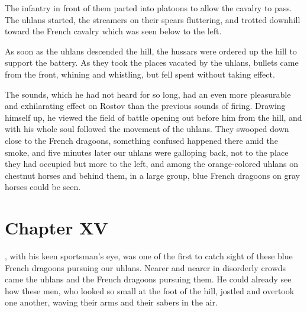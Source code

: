 The infantry in front of them parted into platoons to allow the
cavalry to pass. The uhlans started, the streamers on their
spears fluttering, and trotted downhill toward the French cavalry
which was seen below to the left.

As soon as the uhlans descended the hill, the hussars were
ordered up the hill to support the battery. As they took the
places vacated by the uhlans, bullets came from the front,
whining and whistling, but fell spent without taking effect.

The sounds, which he had not heard for so long, had an even more
pleasurable and exhilarating effect on Rostov than the previous
sounds of firing. Drawing himself up, he viewed the field of
battle opening out before him from the hill, and with his whole
soul followed the movement of the uhlans. They swooped down close
to the French dragoons, something confused happened there amid
the smoke, and five minutes later our uhlans were galloping back,
not to the place they had occupied but more to the left, and
among the orange-colored uhlans on chestnut horses and behind
them, in a large group, blue French dragoons on gray horses could
be seen.


\chapter*{Chapter XV}
\ifaudio     
{} 
\fi

, with his keen sportsman's eye, was one of the first to
catch sight of these blue French dragoons pursuing our
uhlans. Nearer and nearer in disorderly crowds came the uhlans
and the French dragoons pursuing them. He could already see how
these men, who looked so small at the foot of the hill, jostled
and overtook one another, waving their arms and their sabers in
the air.

